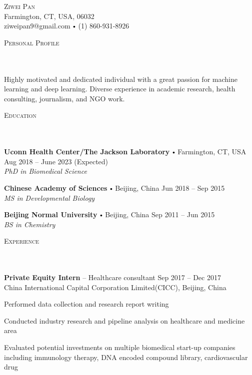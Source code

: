 \documentclass{article}
\newcommand{\contact}[3]{
\vspace*{5pt}
\begin{center}
{\LARGE \scshape {#1}}\\
\vspace{3pt}
#2 
\vspace{2pt}
#3
\end{center}
\vspace*{-8pt}
}
\newcommand{\header}[1]{{
\hspace*{-15pt}\vspace*{6pt} \textsc{#1}} \vspace*{-6pt} 
\lineunder
}
\newcommand{\lineunder}{
\vspace*{-8pt} \\ \hspace*{-18pt} 
\hrulefill \\
}
\newcommand{\content}{
\vspace*{2pt}%
}
\newcommand{\school}[4]{
\textbf{#1} \labelitemi #2 \hfill #3 \\ #4 \vspace*{5pt}
}
\newcommand{\employer}[4]{{
\vspace*{2pt}%
\textbf{#1} #2 \hfill #3\\ #4 \vspace*{2pt}}
}
\renewcommand{\labelitemi}{
$\vcenter{\hbox{\tiny$\bullet$}}$\hspace*{3pt}
}
\renewcommand{\labelitemii}{
$\vcenter{\hbox{\tiny$\bullet$}}$\hspace*{-3pt}
}
\newenvironment{bullet-list-minor}{
\begin{list}{\labelitemii}{\setlength\leftmargin{15pt} 
\topsep 0pt \itemsep -2pt}}{\vspace*{4pt}\end{list}
}
\begin{document}
\small
\smallskip
\vspace*{-44pt}

\contact{Ziwei Pan}
{Farmington, CT, USA, 06032\\}
{ziweipan9@gmail.com \labelitemi (1) 860-931-8926}
\vspace{15pt}
\header{Personal Profile}
\content{Highly motivated and dedicated individual with a great passion for machine learning and deep learning. Diverse experience in academic research, health consulting, journalism, and NGO work.\vspace{5pt}}



\vspace*{4pt}%
\header{Education}
    \school{Uconn Health Center/The Jackson Laboratory}{Farmington, CT, USA}{Aug 2018 -- June 2023 (Expected)}
    {\textit{PhD in Biomedical Science}}

    \school{Chinese Academy of Sciences}{Beijing, China}{Jun 2018 -- Sep 2015}
    {\textit{MS in Developmental Biology}}
    
    \school{Beijing Normal University}{Beijing, China}{Sep 2011 -- Jun 2015}
    {\textit{BS in Chemistry}}
    
\vspace*{4pt}%
\header{Experience}
    \employer{Private Equity Intern}{-- Healthcare consultant}{Sep 2017 -- Dec 2017}{China International Capital Corporation Limited(CICC), Beijing, China}
	\begin{bullet-list-minor}
	\item Performed data collection and research report writing
	\item Conducted industry research and pipeline analysis on healthcare and medicine area
	\item Evaluated potential investments on multiple biomedical start-up companies including immunology therapy, DNA encoded compound library, cardiovascular drug
    \end{bullet-list-minor}
    
\end{document}
